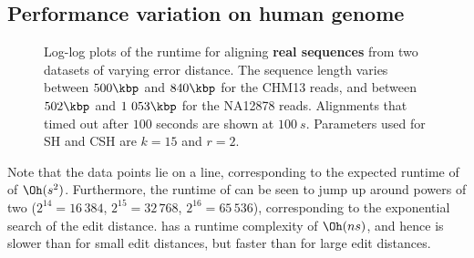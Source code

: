 \subsection{Performance variation on human genome}\label{GLOBALsec:variation-human-results}

\begin{figure}[H]
  \centering
  \hfill
  \caption[Runtime scaling with alignment cost]{Log-log plots of the runtime for aligning \textbf{real sequences}
  from two datasets of varying error distance. The sequence length varies
  between $500\kbp$ and $840\kbp$ for the CHM13 reads, and between $502\kbp$ and
  $1\ 053\kbp$ for the NA12878 reads. Alignments that timed out after $100$
  seconds are shown at $\qty{100}{s}$. Parameters used for SH and CSH are
  $k{=}15$ and $r{=}2$.}
  \label{GLOBALfig:human-results-unsorted}
\end{figure}

Note that the \wfa data points lie on a line, corresponding to the
expected runtime of \wfa of $\Oh(s^2)$. Furthermore, the runtime of \edlib can be
seen to jump up around powers of two ($2^{14} {=} 16\,384$, $2^{15} {=} 32\,768$,
$2^{16} {=} 65\,536$), corresponding to the exponential search of the edit
distance. \edlib has a runtime complexity of $\Oh(ns)$, and hence is slower than
\wfa for small edit distances, but faster than \wfa for large edit distances.
